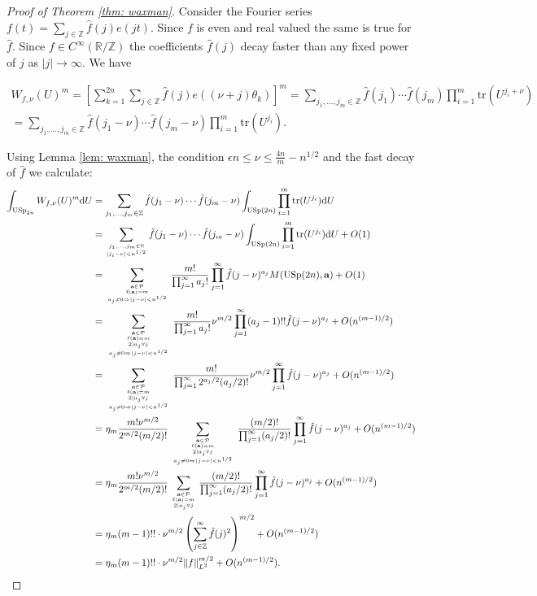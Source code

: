 \documentclass[alphabetic, 
        colorlinks,
        linkcolor=red,  citecolor=blue,
        backref
]{amsart}
\numberwithin{equation}{section}
\theoremstyle{definition}
\newcommand{\N}{{\mathbb N}}
\newcommand{\Z}{{\mathbb Z}}
\newcommand{\R}{{\mathbb R}}
\newcommand{\USp}{{\mathrm{USp}}}
\begin{document}
\begin{proof}[Proof of Theorem \ref{thm: waxman}] Consider the Fourier series $f(t)=\sum_{j\in\Z}\hat f(j)e(jt).$ Since $f$ is even and real valued the same is true for $\hat f$. Since $f\in C^\infty(\R/\Z)$ the coefficients $\hat f(j)$ decay faster than any fixed power of $j$ as $|j|\to\infty$. We have

\begin{multline*}W_{f,\nu}(U)^m=\left[\sum_{k=1}^{2n}\sum_{j\in\Z}\hat f(j)e((\nu+j)\theta_k)\right]^m=
\sum_{j_1,\ldots,j_m\in\Z}\hat f(j_1)\cdots\hat f(j_m)\prod_{i=1}^m\mathrm{tr}(U^{j_i+\nu})
\\=\sum_{j_1,\ldots,j_m\in\Z}\hat f(j_1-\nu)\cdots\hat f(j_m-\nu)\prod_{i=1}^m\mathrm{tr}(U^{j_i}).\end{multline*}

Using Lemma \ref{lem: waxman}, the condition $\epsilon n\le\nu\le\frac{4n}m-n^{1/2}$ and the fast decay of $\hat f$ we calculate:
\begin{align*}
\int_{\USp_{2n}}W_{f,\nu}(U)^m\mathrm dU&=\sum_{j_1,\ldots,j_m\in\Z}\hat f(j_1-\nu)\cdots\hat f(j_m-\nu)\int_{\USp(2n)}\prod_{i=1}^m\mathrm{tr}(U^{j_i})\mathrm dU
\\&=
\sum_{j_1,\ldots,j_m\in\N\atop{|j_i-\nu|<n^{1/2}}}\hat f(j_1-\nu)\cdots\hat f(j_m-\nu)\int_{\USp(2n)}\prod_{i=1}^m\mathrm{tr}(U^{j_i})\mathrm dU+O(1)
\\&=\sum_{\mathbf a\in\mathcal P\atop{\ell(\mathbf a)=m\atop{a_j\neq 0\Rightarrow|j-\nu|<n^{1/2}}}}\frac{m!}{\prod_{j=1}^\infty a_j!}\prod_{j=1}^\infty \hat f(j-\nu)^{a_j}M(\USp(2n),\mathbf a)+O(1)
\\&=\sum_{\mathbf a\in\mathcal P\atop{\ell(\mathbf a)=m\atop{2|a_j\forall j\atop{a_j\neq 0\Rightarrow|j-\nu|<n^{1/2}}}}}\frac{m!}{\prod_{j=1}^\infty a_j!}\nu^{m/2}\prod_{j=1}^\infty  (a_j-1)!!\hat f(j-\nu)^{a_j}+O(n^{(m-1)/2})
\\&=\sum_{\mathbf a\in\mathcal P\atop{\ell(\mathbf a)=m\atop{2|a_j\forall j\atop{a_j\neq 0\Rightarrow|j-\nu|<n^{1/2}}}}}\frac{m!}{\prod_{j=1}^\infty 2^{a_j/2}(a_j/2)!}\nu^{m/2}\prod_{j=1}^\infty  \hat f(j-\nu)^{a_j}+O(n^{(m-1)/2})
\\&=\eta_m\frac{m!\nu^{m/2}}{2^{m/2}(m/2)!}\sum_{\mathbf a\in\mathcal P\atop{\ell(\mathbf a)=m\atop{2|a_j\forall j\atop{a_j\neq 0\Rightarrow|j-\nu|<n^{1/2}}}}}\frac{(m/2)!}{\prod_{j=1}^\infty (a_j/2)!}\prod_{j=1}^\infty  \hat f(j-\nu)^{a_j}+O(n^{(m-1)/2})
\\&=\eta_m\frac{m!\nu^{m/2}}{2^{m/2}(m/2)!}\sum_{\mathbf a\in\mathcal P\atop{\ell(\mathbf a)=m\atop{2|a_j\forall j}}}\frac{(m/2)!}{\prod_{j=1}^\infty (a_j/2)!}\prod_{j=1}^\infty  \hat f(j-\nu)^{a_j}+O(n^{(m-1)/2})
\\&=\eta_m(m-1)!!\cdot\nu^{m/2}\left(\sum_{j\in\Z}^\infty\hat f(j)^2\right)^{m/2}+O(n^{(m-1)/2})\\&=\eta_m(m-1)!!\cdot\nu^{m/2
}\|f\|_{L^2}^{m/2}+O(n^{(m-1)/2}).
\end{align*}
\end{proof}
\end{document}
